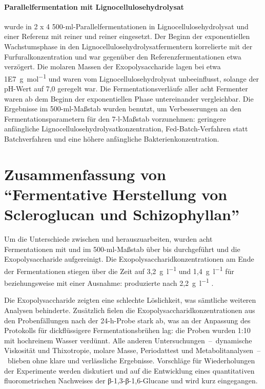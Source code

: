 \paragraph{Parallelfermentation mit Lignocellulosehydrolysat}
\strain{} wurde in 2 x 4 500-ml-Parallelfermentationen in Lignocellulosehydrolysat und einer Referenz mit reiner \GLC{} und reiner \XYL{} eingesetzt. Der Beginn der exponentiellen Wachstumsphase in den Lignocellulosehydrolysatfermentern korrelierte mit der Furfuralkonzentration und war gegenüber den Referenzfermentationen etwa  verzögert. Die molaren Massen der Exopolysaccharide lagen bei etwa \SI{1E7}{\gram\per\mole} und waren vom Lignocellulosehydrolysat unbeeinflusst, solange der pH-Wert auf 7,0 geregelt war. Die Fermentationsverläufe aller acht Fermenter waren ab dem Beginn der exponentiellen Phase untereinander vergleichbar. Die Ergebnisse im 500-ml-Maßstab wurden benutzt, um Verbesserungen an den Fermentationsparametern für den 7-l-Maßstab vorzunehmen: geringere anfängliche Lignocellulosehydrolysatkonzentration, Fed-Batch-Verfahren statt Batchverfahren und eine höhere anfängliche Bakterienkonzentration.

\section*{Zusammenfassung von \enquote{Fermentative Herstellung von Scleroglucan und Schizophyllan}}
Um die Unterschiede zwischen \SCL{} und \SHZ{} herauszuarbeiten, wurden acht Fermentationen mit \rolf{} und \comm{} im 500-ml-Maßstab über  bis  durchgeführt und die Exopolysaccharide aufgereinigt. Die Exopolysaccharidkonzentrationen am Ende der Fermentationen stiegen über die Zeit auf 3,2~\si{\gram\per\litre} und 1,4~\si{\gram\per\litre} für \SCL{} beziehungsweise \SHZ{} mit einer Ausnahme: \comm{} produzierte nach  2,2~\si{\gram\per\litre} \SHZ{}.

Die Exopolysaccharide zeigten eine schlechte Löslichkeit, was sämtliche weiteren Analysen behinderte. Zusätzlich fielen die Exopolysaccharidkonzentrationen aus den Probenfällungen nach der 24-h-Probe stark ab, was an der Anpassung des Protokolls für dickflüssigere Fermentationsbrühen lag: die Proben wurden 1:10 mit hochreinem Wasser verdünnt. Alle anderen Untersuchungen~--~dynamische Viskosität und Thixotropie, molare Masse, Periodattest und Metabolitanalysen~--~blieben ohne klare und verlässliche Ergebnisse. Vorschläge für Wiederholungen der Experimente werden diskutiert und auf die Entwicklung eines quantitativen fluorometrischen Nachweises der β-1,3-β-1,6-Glucane \SCL{} und \SHZ{} wird kurz eingegangen.
\cleardoublepage
{}
\pagestyle{headings}

